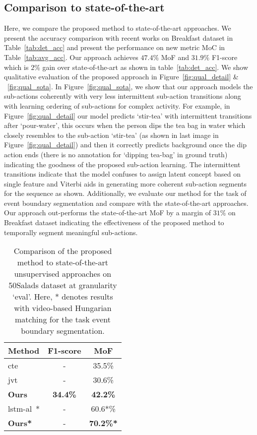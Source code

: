 \documentclass[final]{cvpr}
\begin{document}
\subsection{Comparison to state-of-the-art}
\par Here, we compare the proposed method to state-of-the-art approaches.
We present the accuracy comparison with recent works on Breakfast dataset in Table~\ref{tab:det_acc} and present the performance on new metric MoC in Table~\ref{tab:avg_acc}. 
Our approach achieves $47.4\%$ MoF and $31.9\%$ F1-score which is $2\%$ gain over state-of-the-art as shown in table~\ref{tab:det_acc}.
We show qualitative evaluation of the proposed approach in Figure~\ref{fig:qual_detail} \& ~\ref{fig:qual_sota}. In Figure~\ref{fig:qual_sota}, we show that our approach models the sub-actions coherently with very less intermittent sub-action transitions along with learning ordering of sub-actions for complex activity. For example, in Figure~\ref{fig:qual_detail} our model predicts `stir-tea' with intermittent transitions after `pour-water', this occurs when the person dips the tea bag in water which closely resembles to the sub-action `stir-tea' (as shown in last image in Figure~\ref{fig:qual_detail}) and then it correctly predicts background once the dip action ends (there is no annotation for `dipping tea-bag' in ground truth) indicating the goodness of the proposed sub-action learning. The intermittent transitions indicate that the model confuses to assign latent concept based on single feature and Viterbi aids in generating more coherent sub-action segments for the sequence as shown. Additionally, we evaluate our method for the task of event boundary segmentation and compare with the state-of-the-art approaches. Our approach out-performs the state-of-the-art MoF by a margin of $31\%$ on Breakfast dataset indicating the effectiveness of the proposed method to temporally segment meaningful sub-actions.



\begin{table}[t]
  \caption{ {\small Comparison of the proposed method to state-of-the-art unsupervised approaches on 50Salads dataset at granularity `eval'. Here, * denotes results with video-based Hungarian matching for the task event boundary segmentation.} }
  \label{tab:sal_acc}
  \centering
    \small
  \begin{tabular}{lcc}
    \toprule
    {\bf Method} & {\bf F1-score} & {\bf MoF}\\
    \midrule
    {\sc cte}~\cite{kukleva2019unsupervised}  & - & 35.5\%      \\
    {\sc jvt}~\cite{vidalmata2020joint} & - & 30.6\% \\
    \midrule
    {\bf Ours}  & \textbf{34.4\%} &  \textbf{42.2\%}  \\
    \midrule
    \midrule
    {\sc lstm-al}~\cite{aakur2019perceptual}* & - & 60.6*\% \\
    {\bf Ours*}  & - & \textbf{70.2\%*} \\
    \bottomrule
  \end{tabular}
\end{table}
\end{document}
